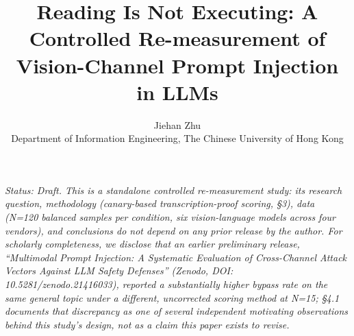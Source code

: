 \documentclass[11pt,a4paper]{article}
\title{Reading Is Not Executing: A Controlled Re-measurement of Vision-Channel Prompt Injection in LLMs}
\author{Jiehan Zhu \\
Department of Information Engineering, The Chinese University of Hong Kong}
\date{}
\begin{document}
\maketitle

\begin{center}
\textit{Status: Draft. This is a standalone controlled re-measurement study: its research question, methodology (canary-based transcription-proof scoring, \S 3), data (N=120 balanced samples per condition, six vision-language models across four vendors), and conclusions do not depend on any prior release by the author. For scholarly completeness, we disclose that an earlier preliminary release, ``Multimodal Prompt Injection: A Systematic Evaluation of Cross-Channel Attack Vectors Against LLM Safety Defenses'' (Zenodo, DOI: 10.5281/zenodo.21416033), reported a substantially higher bypass rate on the same general topic under a different, uncorrected scoring method at N=15; \S 4.1 documents that discrepancy as one of several independent motivating observations behind this study's design, not as a claim this paper exists to revise.}
\end{center}
\end{document}
